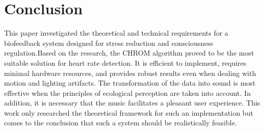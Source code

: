 \section{Conclusion}

This paper investigated the theoretical and technical requirements for a biofeedback system designed for stress reduction and consciousness regulation.Based on the research, the CHROM algorithm proved to be the most suitable solution for heart rate detection. It is efficient to implement, requires minimal hardware resources, and provides robust results even when dealing with motion and lighting artifacts. The transformation of the data into sound is most effective when the principles of ecological perception are taken into account.
In addition, it is necessary that the music facilitates a pleasant user experience. This work only researched the theoretical framework for such an implementation but comes to the conclusion that such a system should be realistically feasible.

